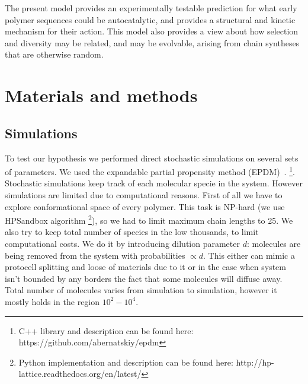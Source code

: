 \documentclass[journal=jacsat,manuscript=article,layout=twocolumn]{achemso}
\begin{document}
  The present model provides an experimentally testable prediction for what early 
  polymer sequences could be autocatalytic, and provides a structural and kinetic mechanism for 
their action.  This model also provides a view about how selection and diversity may be related, 
and may be evolvable, arising from chain syntheses that are otherwise random.



\section{Materials and methods}\label{sec:mat}
\subsection{Simulations}\label{sec:mat-sim}
To test our hypothesis we performed direct stochastic simulations on several sets of parameters. We 
used the expandable partial propensity method (EPDM)~\cite{Guseva2016b}.
\footnote{C++ library and description can be found here: https://github.com/abernatskiy/epdm}. 
Stochastic simulations keep track of each 
molecular specie in the system. However simulations are limited due to computational reasons. 
First of all we have to explore conformational space of every polymer. This task is NP-hard (we 
use 
HPSandbox algorithm\cite{lau1989lattice,Dill2008} \footnote{Python implementation and description 
can be found here: http://hp-lattice.readthedocs.org/en/latest/}), so we had to limit 
maximum chain lengths to 25. We also try to keep total number of species in the low thousands, to 
limit computational costs. We do it by introducing dilution parameter $d$: molecules are being 
removed from the system with probabilities $\propto d$. 
This either can mimic a protocell splitting and loose of materials due to it or in the case when 
system isn't bounded by any borders the fact that some molecules will diffuse away. Total number 
of 
molecules varies from simulation to simulation, 
however it mostly holds in the region $10^2-10^4$.
\end{document}
